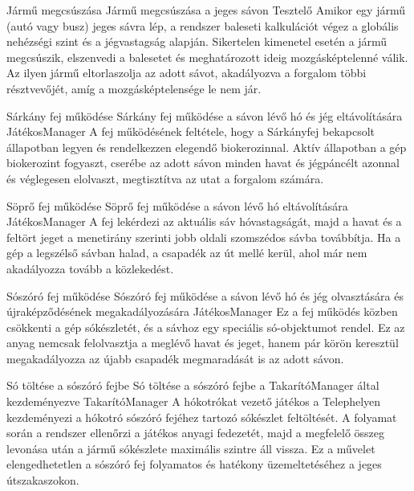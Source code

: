 \begin{use-case}
    {Jármű megcsúszása}
    {Jármű megcsúszása a jeges sávon}
    {Tesztelő}
    Amikor egy jármű (autó vagy busz) jeges sávra lép, a rendszer baleseti kalkulációt végez a globális nehézségi szint és a jégvastagság alapján. Sikertelen kimenetel esetén a jármű megcsúszik, elszenvedi a balesetet és meghatározott ideig mozgásképtelenné válik. Az ilyen jármű eltorlaszolja az adott sávot, akadályozva a forgalom többi résztvevőjét, amíg a mozgásképtelensége le nem jár.
\end{use-case}

\begin{use-case}
    {Sárkány fej működése}
    {Sárkány fej működése a sávon lévő hó és jég eltávolítására}
    {JátékosManager}
    A fej működésének feltétele, hogy a Sárkányfej bekapcsolt állapotban legyen és rendelkezzen elegendő biokerozinnal. Aktív állapotban a gép biokerozint fogyaszt, cserébe az adott sávon minden havat és jégpáncélt azonnal és véglegesen elolvaszt, megtisztítva az utat a forgalom számára.
\end{use-case}

\begin{use-case}
    {Söprő fej működése}
    {Söprő fej működése a sávon lévő hó eltávolítására}
    {JátékosManager}
    A fej lekérdezi az aktuális sáv hóvastagságát, majd a havat és a feltört jeget a menetirány szerinti jobb oldali szomszédos sávba továbbítja. Ha a gép a legszélső sávban halad, a csapadék az út mellé kerül, ahol már nem akadályozza tovább a közlekedést.
\end{use-case}

\begin{use-case}
    {Sószóró fej működése}
    {Sószóró fej működése a sávon lévő hó és jég olvasztására és újraképződésének megakadályozására}
    {JátékosManager}
    Ez a fej működés közben csökkenti a gép sókészletét, és a sávhoz egy speciális só-objektumot rendel. Ez az anyag nemcsak felolvasztja a meglévő havat és jeget, hanem pár körön keresztül megakadályozza az újabb csapadék megmaradását is az adott sávon. 
\end{use-case}

\begin{use-case}
    {Só töltése a sószóró fejbe}
    {Só töltése a sószóró fejbe a TakarítóManager által kezdeményezve}
    {TakarítóManager}
    A hókotrókat vezető játékos a Telephelyen kezdeményezi a hókotró sószóró fejéhez tartozó sókészlet feltöltését. A folyamat során a rendszer ellenőrzi a játékos anyagi fedezetét, majd a megfelelő összeg levonása után a jármű sókészlete maximális szintre áll vissza. Ez a művelet elengedhetetlen a sószóró fej folyamatos és hatékony üzemeltetéséhez a jeges útszakaszokon.
\end{use-case}


